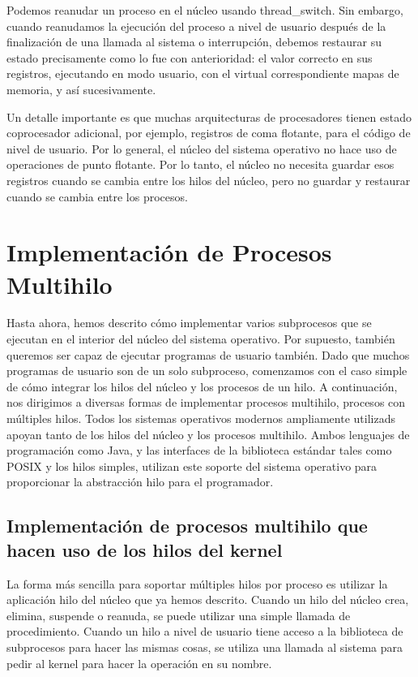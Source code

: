 \documentclass[10pt]{book}
\begin{document}
Podemos reanudar un proceso en el núcleo usando {\mf thread\_switch}. Sin embargo, cuando reanudamos la ejecución del proceso a nivel de usuario después de la finalización de una llamada al sistema o interrupción, debemos restaurar su estado precisamente como lo fue con anterioridad: el valor correcto en sus registros, ejecutando en modo usuario, con el virtual correspondiente mapas de memoria, y así sucesivamente.

Un detalle importante es que muchas arquitecturas de procesadores tienen estado coprocesador adicional, por ejemplo, registros de coma flotante, para el código de nivel de usuario. Por lo general, el núcleo del sistema operativo no hace uso de operaciones de punto flotante. Por lo tanto, el núcleo no necesita guardar esos registros cuando se cambia entre los hilos del núcleo, pero no guardar y restaurar cuando se cambia entre los procesos.

\section{Implementación de Procesos Multihilo}
Hasta ahora, hemos descrito cómo implementar varios subprocesos que se ejecutan en el interior del núcleo del sistema operativo. Por supuesto, también queremos ser capaz de ejecutar programas de usuario también. Dado que muchos programas de usuario son de un solo subproceso, comenzamos con el caso simple de cómo integrar los hilos del núcleo y los procesos de un hilo. A continuación, nos dirigimos a diversas formas de implementar procesos multihilo, procesos con múltiples hilos. Todos los sistemas operativos modernos ampliamente utilizads apoyan tanto de los hilos del núcleo y los procesos multihilo. Ambos lenguajes de programación como Java, y las interfaces de la biblioteca estándar tales como POSIX y los hilos simples, utilizan este soporte del sistema operativo para proporcionar la abstracción hilo para el programador.

\subsection{Implementación de procesos multihilo que hacen uso de los hilos del kernel}
La forma más sencilla para soportar múltiples hilos por proceso es utilizar la aplicación hilo del núcleo que ya hemos descrito. Cuando un hilo del núcleo crea, elimina, suspende o reanuda, se puede utilizar una simple llamada de procedimiento. Cuando un hilo a nivel de usuario tiene acceso a la biblioteca de subprocesos para hacer las mismas cosas, se utiliza una llamada al sistema para pedir al kernel para hacer la operación en su nombre.
\end{document}
